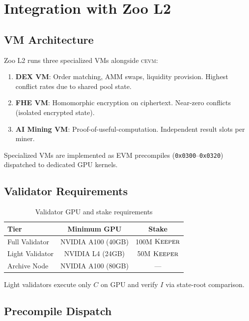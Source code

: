 \documentclass[11pt,letterpaper]{article}
\theoremstyle{definition}
\theoremstyle{remark}
\newcommand{\cevm}{\textsc{cevm}}
\newcommand{\KEEPER}{\textsc{Keeper}}
\begin{document}
\section{Integration with Zoo L2}
\label{sec:integration}

\subsection{VM Architecture}

Zoo L2 runs three specialized VMs alongside \cevm{}:

\begin{enumerate}[leftmargin=*]
\item \textbf{DEX VM}: Order matching, AMM swaps, liquidity provision. Highest conflict rates due to shared pool state.
\item \textbf{FHE VM}: Homomorphic encryption on ciphertext. Near-zero conflicts (isolated encrypted state).
\item \textbf{AI Mining VM}: Proof-of-useful-computation. Independent result slots per miner.
\end{enumerate}

Specialized VMs are implemented as EVM precompiles (\texttt{0x0300}--\texttt{0x0320}) dispatched to dedicated GPU kernels.

\subsection{Validator Requirements}

\begin{table}[h]
\centering
\begin{tabular}{lcc}
\toprule
\textbf{Tier} & \textbf{Minimum GPU} & \textbf{Stake} \\
\midrule
Full Validator & NVIDIA A100 (40GB) & 100M $\KEEPER$ \\
Light Validator & NVIDIA L4 (24GB) & 50M $\KEEPER$ \\
Archive Node & NVIDIA A100 (80GB) & --- \\
\bottomrule
\end{tabular}
\caption{Validator GPU and stake requirements}
\label{tab:validator-gpu}
\end{table}

Light validators execute only $C$ on GPU and verify $I$ via state-root comparison.

\subsection{Precompile Dispatch}
\end{document}
